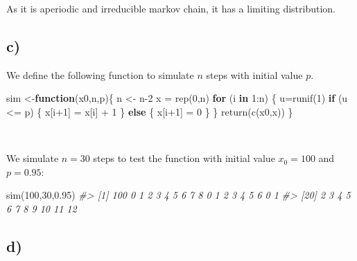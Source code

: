 \documentclass[
]{article}
\newenvironment{Shaded}{\begin{snugshade}}{\end{snugshade}}
\newcommand{\CommentTok}[1]{\textcolor[rgb]{0.56,0.35,0.01}{\textit{#1}}}
\newcommand{\ControlFlowTok}[1]{\textcolor[rgb]{0.13,0.29,0.53}{\textbf{#1}}}
\newcommand{\DecValTok}[1]{\textcolor[rgb]{0.00,0.00,0.81}{#1}}
\newcommand{\FloatTok}[1]{\textcolor[rgb]{0.00,0.00,0.81}{#1}}
\newcommand{\FunctionTok}[1]{\textcolor[rgb]{0.00,0.00,0.00}{#1}}
\newcommand{\NormalTok}[1]{#1}
\newcommand{\OtherTok}[1]{\textcolor[rgb]{0.56,0.35,0.01}{#1}}
\newcommand{\SpecialCharTok}[1]{\textcolor[rgb]{0.00,0.00,0.00}{#1}}
\begin{document}
As it is aperiodic and irreducible markov chain, it has a limiting
distribution.

\hypertarget{c-1}{%
\subsection{c)}\label{c-1}}

We define the following function to simulate \(n\) steps with initial
value \(p\).

\begin{Shaded}
\begin{Highlighting}[]
\NormalTok{sim }\OtherTok{\textless{}{-}}\ControlFlowTok{function}\NormalTok{(x0,n,p)\{ }
\NormalTok{    n }\OtherTok{\textless{}{-}}\NormalTok{ n}\DecValTok{{-}2}
\NormalTok{    x }\OtherTok{=} \FunctionTok{rep}\NormalTok{(}\DecValTok{0}\NormalTok{,n)}
    \ControlFlowTok{for}\NormalTok{ (i }\ControlFlowTok{in} \DecValTok{1}\SpecialCharTok{:}\NormalTok{n) \{}
\NormalTok{        u}\OtherTok{=}\FunctionTok{runif}\NormalTok{(}\DecValTok{1}\NormalTok{) }
        \ControlFlowTok{if}\NormalTok{ (u }\SpecialCharTok{\textless{}=}\NormalTok{ p) \{}
\NormalTok{            x[i}\SpecialCharTok{+}\DecValTok{1}\NormalTok{] }\OtherTok{=}\NormalTok{ x[i] }\SpecialCharTok{+} \DecValTok{1}
\NormalTok{        \} }\ControlFlowTok{else}\NormalTok{ \{}
\NormalTok{            x[i}\SpecialCharTok{+}\DecValTok{1}\NormalTok{] }\OtherTok{=} \DecValTok{0}
\NormalTok{        \}}
\NormalTok{    \} }
    \FunctionTok{return}\NormalTok{(}\FunctionTok{c}\NormalTok{(x0,x))}
\NormalTok{\}}
\end{Highlighting}
\end{Shaded}

~

We simulate \(n=30\) steps to test the function with initial value
\(x_{0} = 100\) and \(p=0.95\):

\begin{Shaded}
\begin{Highlighting}[]
\FunctionTok{sim}\NormalTok{(}\DecValTok{100}\NormalTok{,}\DecValTok{30}\NormalTok{,}\FloatTok{0.95}\NormalTok{)}
\CommentTok{\#\textgreater{}  [1] 100   0   1   2   3   4   5   6   7   8   0   1   2   3   4   5   6   0   1}
\CommentTok{\#\textgreater{} [20]   2   3   4   5   6   7   8   9  10  11  12}
\end{Highlighting}
\end{Shaded}

\hypertarget{d-1}{%
\subsection{d)}\label{d-1}}
\end{document}
